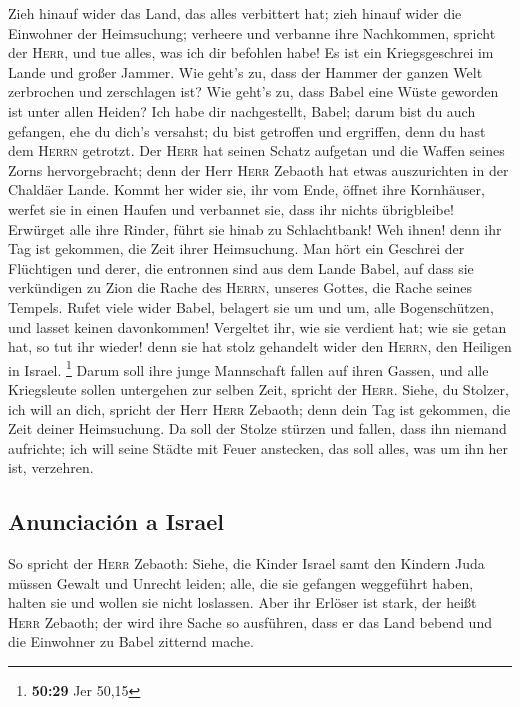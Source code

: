  Zieh hinauf wider das Land, das alles verbittert hat;
zieh hinauf wider die Einwohner der Heimsuchung; verheere und verbanne
ihre Nachkommen, spricht der \textsc{Herr}, und tue alles, was ich dir
befohlen habe!  Es ist ein Kriegsgeschrei im Lande und
großer Jammer.  Wie geht's zu, dass der Hammer der ganzen
Welt zerbrochen und zerschlagen ist? Wie geht's zu, dass Babel eine
Wüste geworden ist unter allen Heiden?  Ich habe dir
nachgestellt, Babel; darum bist du auch gefangen, ehe du dich's
versahst; du bist getroffen und ergriffen, denn du hast dem
\textsc{Herrn} getrotzt.  Der \textsc{Herr} hat seinen
Schatz aufgetan und die Waffen seines Zorns hervorgebracht; denn der
Herr \textsc{Herr} Zebaoth hat etwas auszurichten in der Chaldäer Lande.
 Kommt her wider sie, ihr vom Ende, öffnet ihre
Kornhäuser, werfet sie in einen Haufen und verbannet sie, dass ihr
nichts übrigbleibe!  Erwürget alle ihre Rinder, führt sie
hinab zu Schlachtbank! Weh ihnen! denn ihr Tag ist gekommen, die Zeit
ihrer Heimsuchung.  Man hört ein Geschrei der Flüchtigen
und derer, die entronnen sind aus dem Lande Babel, auf dass sie
verkündigen zu Zion die Rache des \textsc{Herrn}, unseres Gottes, die
Rache seines Tempels.  Rufet viele wider Babel, belagert
sie um und um, alle Bogenschützen, und lasset keinen davonkommen!
Vergeltet ihr, wie sie verdient hat; wie sie getan hat, so tut ihr
wieder! denn sie hat stolz gehandelt wider den \textsc{Herrn}, den
Heiligen in Israel. \footnote{\textbf{50:29} Jer 50,15} 
Darum soll ihre junge Mannschaft fallen auf ihren Gassen, und alle
Kriegsleute sollen untergehen zur selben Zeit, spricht der
\textsc{Herr}.  Siehe, du Stolzer, ich will an dich,
spricht der Herr \textsc{Herr} Zebaoth; denn dein Tag ist gekommen, die
Zeit deiner Heimsuchung.  Da soll der Stolze stürzen und
fallen, dass ihn niemand aufrichte; ich will seine Städte mit Feuer
anstecken, das soll alles, was um ihn her ist, verzehren.

\hypertarget{anunciaciuxf3n-a-israel}{%
\subsection{Anunciación a Israel}\label{anunciaciuxf3n-a-israel}}

 So spricht der \textsc{Herr} Zebaoth: Siehe, die Kinder
Israel samt den Kindern Juda müssen Gewalt und Unrecht leiden; alle, die
sie gefangen weggeführt haben, halten sie und wollen sie nicht
loslassen.  Aber ihr Erlöser ist stark, der heißt
\textsc{Herr} Zebaoth; der wird ihre Sache so ausführen, dass er das
Land bebend und die Einwohner zu Babel zitternd mache.

